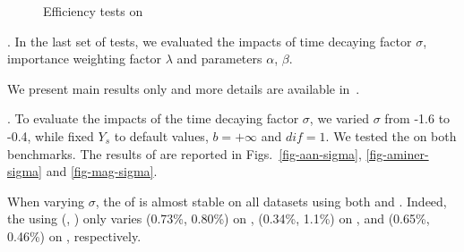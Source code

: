 \begin{figure}[tb!]
\begin{center}
\end{center}
\vspace{-5ex}
\caption{\small Efficiency tests on \magdata}
\label{fig-time}
\vspace{-3ex}
\end{figure}



.
In the last set of tests, we evaluated the impacts of time decaying factor $\sigma$, importance weighting factor $\lambda$ and parameters $\alpha$, $\beta$.

We present main results only and more details are available in~\cite{ERank-full}.




. To evaluate the impacts of the time decaying factor $\sigma$, we varied $\sigma$ from -1.6 to -0.4, while fixed $Y_s$ to default values, $b=+\infty$ and $dif=1$. We tested the \PairAcc on both benchmarks. The results of \PairAcc are reported in Figs.~\ref{fig-aan-sigma}, \ref{fig-aminer-sigma} and \ref{fig-mag-sigma}.



When varying $\sigma$, the \PairAcc of \ensemblerank is almost stable on all datasets using both \fcita and \recom. Indeed, the \PairAcc using (\fcita, \recom) only varies (0.73\%, 0.80\%) on \aan, (0.34\%, 1.1\%) on \aminer, and (0.65\%, 0.46\%) on \magdata, respectively.

